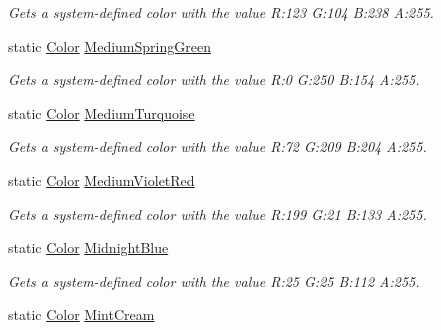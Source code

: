 \begin{DoxyCompactItemize}
\begin{DoxyCompactList}\small\item\em Gets a system-\/defined color with the value R\+:123 G\+:104 B\+:238 A\+:255.\end{DoxyCompactList}\item 
static \hyperlink{structMicrosoft_1_1Xna_1_1Framework_1_1Color}{Color} \hyperlink{structMicrosoft_1_1Xna_1_1Framework_1_1Color_a4f7c658d76ba48658592cef21be13166}{Medium\+Spring\+Green}
\begin{DoxyCompactList}\small\item\em Gets a system-\/defined color with the value R\+:0 G\+:250 B\+:154 A\+:255.\end{DoxyCompactList}\item 
static \hyperlink{structMicrosoft_1_1Xna_1_1Framework_1_1Color}{Color} \hyperlink{structMicrosoft_1_1Xna_1_1Framework_1_1Color_a225190952641e4b27e5ac21e00f5c496}{Medium\+Turquoise}
\begin{DoxyCompactList}\small\item\em Gets a system-\/defined color with the value R\+:72 G\+:209 B\+:204 A\+:255.\end{DoxyCompactList}\item 
static \hyperlink{structMicrosoft_1_1Xna_1_1Framework_1_1Color}{Color} \hyperlink{structMicrosoft_1_1Xna_1_1Framework_1_1Color_a62798e2b9d8927ded7477b48f7c1d66f}{Medium\+Violet\+Red}
\begin{DoxyCompactList}\small\item\em Gets a system-\/defined color with the value R\+:199 G\+:21 B\+:133 A\+:255.\end{DoxyCompactList}\item 
static \hyperlink{structMicrosoft_1_1Xna_1_1Framework_1_1Color}{Color} \hyperlink{structMicrosoft_1_1Xna_1_1Framework_1_1Color_a34eaca4b78132534877c32071773de19}{Midnight\+Blue}
\begin{DoxyCompactList}\small\item\em Gets a system-\/defined color with the value R\+:25 G\+:25 B\+:112 A\+:255.\end{DoxyCompactList}\item 
static \hyperlink{structMicrosoft_1_1Xna_1_1Framework_1_1Color}{Color} \hyperlink{structMicrosoft_1_1Xna_1_1Framework_1_1Color_a7805572bd3502b4963330067d014b1de}{Mint\+Cream}

\end{DoxyCompactItemize}
